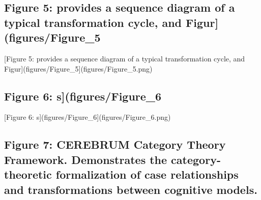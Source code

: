 \documentclass[
  11pt,
  letterpaper,
]{article}
\begin{document}
\pagebreak

\hypertarget{figure-5-provides-a-sequence-diagram-of-a-typical-transformation-cycle-and-figurfiguresfigure_5}{%
\subsection{Figure 5: provides a sequence diagram of a typical
transformation cycle, and
Figur{]}(figures/Figure\_5}\label{figure-5-provides-a-sequence-diagram-of-a-typical-transformation-cycle-and-figurfiguresfigure_5}}

{[}Figure 5: provides a sequence diagram of a typical transformation
cycle, and Figur{]}(figures/Figure\_5{]}(figures/Figure\_5.png)

\pagebreak

\hypertarget{figure-6-sfiguresfigure_6}{%
\subsection{Figure 6:
s{]}(figures/Figure\_6}\label{figure-6-sfiguresfigure_6}}

{[}Figure 6: s{]}(figures/Figure\_6{]}(figures/Figure\_6.png)

\pagebreak

\hypertarget{figure-7-cerebrum-category-theory-framework.-demonstrates-the-category-theoretic-formalization-of-case-relationships-and-transformations-between-cognitive-models.}{%
\subsection{Figure 7: CEREBRUM Category Theory Framework. Demonstrates
the category-theoretic formalization of case relationships and
transformations between cognitive
models.}\label{figure-7-cerebrum-category-theory-framework.-demonstrates-the-category-theoretic-formalization-of-case-relationships-and-transformations-between-cognitive-models.}}
\end{document}
